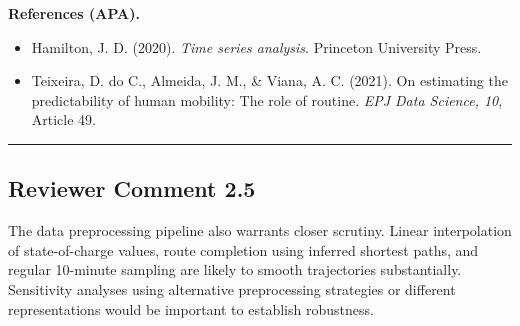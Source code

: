 \documentclass{NSF}
\begin{document}
\vskip 0.05in
\noindent\textbf{References (APA).}
\begin{itemize}
    \item Hamilton, J. D. (2020). \textit{Time series analysis}. Princeton University Press.
    \item Teixeira, D. do C., Almeida, J. M., \& Viana, A. C. (2021). On estimating the predictability of human mobility: The role of routine. \textit{EPJ Data Science, 10}, Article 49.
\end{itemize}

\noindent\rule{16.5cm}{1.0pt}

\subsection{Reviewer Comment 2.5}
\begin{mdframed}
The data preprocessing pipeline also warrants closer scrutiny. Linear interpolation of state-of-charge values, route completion using inferred shortest paths, and regular 10-minute sampling are likely to smooth trajectories substantially. Sensitivity analyses using alternative preprocessing strategies or different representations would be important to establish robustness.
\end{mdframed}
\end{document}
